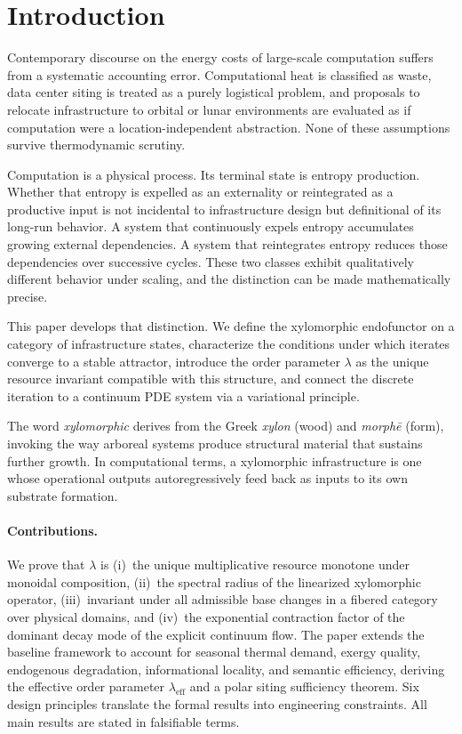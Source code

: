 \documentclass[10pt,twocolumn]{article}
\theoremstyle{plain}
\theoremstyle{definition}
\theoremstyle{remark}
\begin{document}
\section{Introduction}

Contemporary discourse on the energy costs of large-scale computation
suffers from a systematic accounting error. Computational heat is
classified as waste, data center siting is treated as a purely
logistical problem, and proposals to relocate infrastructure to orbital
or lunar environments are evaluated as if computation were a
location-independent abstraction. None of these assumptions survive
thermodynamic scrutiny.

Computation is a physical process. Its terminal state is entropy
production. Whether that entropy is expelled as an externality or
reintegrated as a productive input is not incidental to infrastructure
design but definitional of its long-run behavior. A system that
continuously expels entropy accumulates growing external dependencies.
A system that reintegrates entropy reduces those dependencies over
successive cycles. These two classes exhibit qualitatively different
behavior under scaling, and the distinction can be made mathematically
precise.

This paper develops that distinction. We define the xylomorphic
endofunctor on a category of infrastructure states, characterize the
conditions under which iterates converge to a stable attractor,
introduce the order parameter $\lambda$ as the unique resource
invariant compatible with this structure, and connect the discrete
iteration to a continuum PDE system via a variational principle.

The word \emph{xylomorphic} derives from the Greek \emph{xylon} (wood)
and \emph{morph\=e} (form), invoking the way arboreal systems produce
structural material that sustains further growth. In computational
terms, a xylomorphic infrastructure is one whose operational outputs
autoregressively feed back as inputs to its own substrate formation.

\paragraph{Contributions.} We prove that $\lambda$ is (i)~the unique
multiplicative resource monotone under monoidal composition, (ii)~the
spectral radius of the linearized xylomorphic operator, (iii)~invariant
under all admissible base changes in a fibered category over physical
domains, and (iv)~the exponential contraction factor of the dominant
decay mode of the explicit continuum flow. The paper extends the
baseline framework to account for seasonal thermal demand, exergy
quality, endogenous degradation, informational locality, and semantic
efficiency, deriving the effective order parameter $\lambda_{\mathrm{eff}}$
and a polar siting sufficiency theorem. Six design principles translate
the formal results into engineering constraints. All main results are
stated in falsifiable terms.
\end{document}
